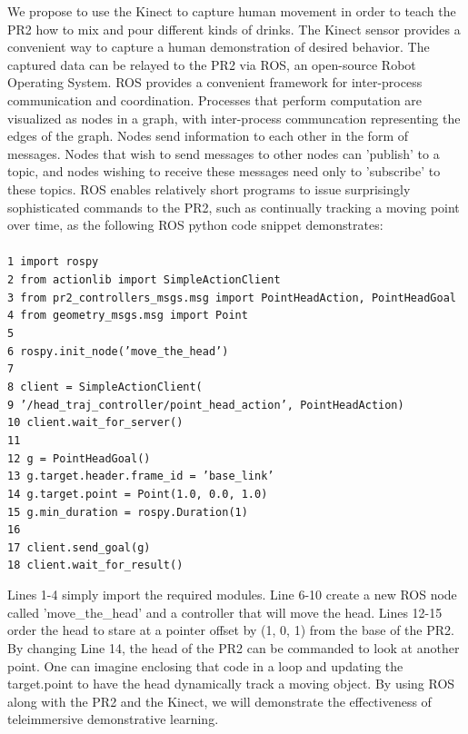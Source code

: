 \documentclass{sig-alternate}
\begin{document}
We propose to use the Kinect to capture human movement in order to teach the PR2 how to mix and pour different kinds of drinks. The Kinect sensor provides a convenient way to capture a human demonstration of desired behavior. The captured data can be relayed to the PR2 via ROS, an open-source Robot Operating System\cite{ros}. ROS provides a convenient framework for inter-process communication and coordination. Processes that perform computation are visualized as nodes in a graph, with inter-process communcation representing the edges of the graph. Nodes send information to each other in the form of messages. Nodes that wish to send messages to other nodes can 'publish' to a topic, and nodes wishing to receive these messages need only to 'subscribe' to these topics. ROS enables relatively short programs to issue surprisingly sophisticated commands to the PR2, such as continually tracking a moving point over time, as the following ROS python code snippet demonstrates\cite{ros_pr2}:\\
{\tt \\1 import rospy\\
2 from actionlib import SimpleActionClient\\
3 from pr2\_controllers\_msgs.msg import PointHeadAction, PointHeadGoal\\
4 from geometry\_msgs.msg import Point\\
5\\
6 rospy.init\_node('move\_the\_head')\\
7\\
8 client = SimpleActionClient(\\
9 '/head\_traj\_controller/point\_head\_action', PointHeadAction)\\
10 client.wait\_for\_server()\\
11\\
12 g = PointHeadGoal()\\
13 g.target.header.frame\_id = 'base\_link'\\
14 g.target.point = Point(1.0, 0.0, 1.0)\\
15 g.min\_duration = rospy.Duration(1)\\
16\\
17 client.send\_goal(g)\\
18 client.wait\_for\_result()\\
}

Lines 1-4 simply import the required modules. Line 6-10 create a new ROS node called 'move\_the\_head' and a controller that will move the head. Lines 12-15 order the head to stare at a pointer offset by (1, 0, 1) from the base of the PR2. By changing Line 14, the head of the PR2 can be commanded to look at another point. One can imagine enclosing that code in a loop and updating the target.point to have the head dynamically track a moving object. By using ROS along with the PR2 and the Kinect, we will demonstrate the effectiveness of teleimmersive demonstrative learning.\\
\end{document}
